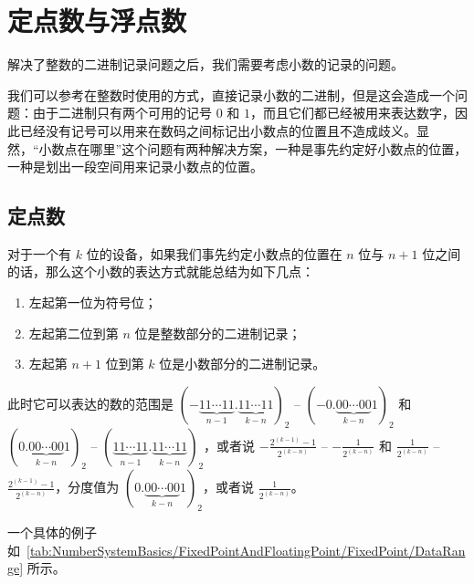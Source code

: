 \section{定点数与浮点数}\label{sec:NumberSystemBasics/FixedPointAndFloatingPoint}
    解决了整数的二进制记录问题之后，我们需要考虑小数的记录的问题。

    我们可以参考在整数时使用的方式，直接记录小数的二进制，但是这会造成一个问题：由于二进制只有两个可用的记号 $0$ 和 $1$，而且它们都已经被用来表达数字，因此已经没有记号可以用来在数码之间标记出小数点的位置且不造成歧义。显然，“小数点在哪里”这个问题有两种解决方案，一种是事先约定好小数点的位置，一种是划出一段空间用来记录小数点的位置。

    \subsection{定点数}\label{subsec:NumberSystemBasics/FixedPointAndFloatingPoint/FixedPoint}
        对于一个有 $k$ 位的设备，如果我们事先约定小数点的位置在 $n$ 位与 $n + 1$ 位之间的话，那么这个小数的表达方式就能总结为如下几点：
        \begin{enumerate}
            \item 左起第一位为符号位；
            \item 左起第二位到第 $n$ 位是整数部分的二进制记录；
            \item 左起第 $n + 1$ 位到第 $k$ 位是小数部分的二进制记录。
        \end{enumerate}

        此时它可以表达的数的范围是 $(-\underbrace{11 \cdots 11}_{n-1}.\underbrace{11 \cdots 11}_{k-n})_2$ -- $(-0.\underbrace{00 \cdots 00}_{k-n}1)_2$ 和 $(0.\underbrace{00 \cdots 00}_{k-n}1)_2$ -- $(\underbrace{11 \cdots 11}_{n-1}.\underbrace{11 \cdots 11}_{k-n})_2$，或者说 $-\frac{2^{(k-1)}-1}{2^{(k-n)}}$ -- $-\frac{1}{2^{(k-n)}}$ 和 $\frac{1}{2^{(k-n)}}$ -- $\frac{2^{(k-1)}-1}{2^{(k-n)}}$，分度值为 $(0.\underbrace{00 \cdots 00}_{k-n}1)_2$，或者说 $\frac{1}{2^{(k-n)}}$。

        一个具体的例子如~\ref{tab:NumberSystemBasics/FixedPointAndFloatingPoint/FixedPoint/DataRange} 所示。

